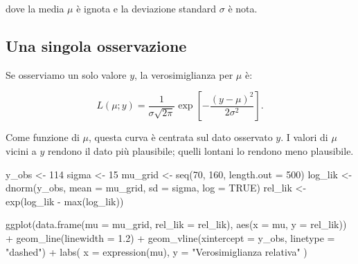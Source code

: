 \documentclass[
  italian,
  letterpaper,
  a4paper,
  11pt,
  open=any]{scrbook}
\newenvironment{Shaded}{\begin{snugshade}}{\end{snugshade}}
\newcommand{\AttributeTok}[1]{\textcolor[rgb]{0.40,0.45,0.13}{#1}}
\newcommand{\ConstantTok}[1]{\textcolor[rgb]{0.56,0.35,0.01}{#1}}
\newcommand{\DecValTok}[1]{\textcolor[rgb]{0.68,0.00,0.00}{#1}}
\newcommand{\FloatTok}[1]{\textcolor[rgb]{0.68,0.00,0.00}{#1}}
\newcommand{\FunctionTok}[1]{\textcolor[rgb]{0.28,0.35,0.67}{#1}}
\newcommand{\NormalTok}[1]{\textcolor[rgb]{0.00,0.23,0.31}{#1}}
\newcommand{\OtherTok}[1]{\textcolor[rgb]{0.00,0.23,0.31}{#1}}
\newcommand{\SpecialCharTok}[1]{\textcolor[rgb]{0.37,0.37,0.37}{#1}}
\newcommand{\StringTok}[1]{\textcolor[rgb]{0.13,0.47,0.30}{#1}}
\theoremstyle{plain}
\theoremstyle{definition}
\theoremstyle{definition}
\theoremstyle{remark}
\begin{document}
dove la media \(\mu\) è ignota e la deviazione standard \(\sigma\) è
nota.

\subsection{Una singola osservazione}\label{una-singola-osservazione}

Se osserviamo un solo valore \(y\), la verosimiglianza per \(\mu\) è:

\[
L(\mu; y)
= \frac{1}{\sigma\sqrt{2\pi}}
\exp\left[-\frac{(y-\mu)^2}{2\sigma^2}\right].
\]

Come funzione di \(\mu\), questa curva è centrata sul dato osservato
\(y\). I valori di \(\mu\) vicini a \(y\) rendono il dato più
plausibile; quelli lontani lo rendono meno plausibile.

\begin{Shaded}
\begin{Highlighting}[]
\NormalTok{y\_obs }\OtherTok{\textless{}{-}} \DecValTok{114}
\NormalTok{sigma }\OtherTok{\textless{}{-}} \DecValTok{15}
\NormalTok{mu\_grid }\OtherTok{\textless{}{-}} \FunctionTok{seq}\NormalTok{(}\DecValTok{70}\NormalTok{, }\DecValTok{160}\NormalTok{, }\AttributeTok{length.out =} \DecValTok{500}\NormalTok{)}
\NormalTok{log\_lik }\OtherTok{\textless{}{-}} \FunctionTok{dnorm}\NormalTok{(y\_obs, }\AttributeTok{mean =}\NormalTok{ mu\_grid, }\AttributeTok{sd =}\NormalTok{ sigma, }\AttributeTok{log =} \ConstantTok{TRUE}\NormalTok{)}
\NormalTok{rel\_lik }\OtherTok{\textless{}{-}} \FunctionTok{exp}\NormalTok{(log\_lik }\SpecialCharTok{{-}} \FunctionTok{max}\NormalTok{(log\_lik))}

\FunctionTok{ggplot}\NormalTok{(}\FunctionTok{data.frame}\NormalTok{(}\AttributeTok{mu =}\NormalTok{ mu\_grid, }\AttributeTok{rel\_lik =}\NormalTok{ rel\_lik),}
       \FunctionTok{aes}\NormalTok{(}\AttributeTok{x =}\NormalTok{ mu, }\AttributeTok{y =}\NormalTok{ rel\_lik)) }\SpecialCharTok{+}
  \FunctionTok{geom\_line}\NormalTok{(}\AttributeTok{linewidth =} \FloatTok{1.2}\NormalTok{) }\SpecialCharTok{+}
  \FunctionTok{geom\_vline}\NormalTok{(}\AttributeTok{xintercept =}\NormalTok{ y\_obs, }\AttributeTok{linetype =} \StringTok{"dashed"}\NormalTok{) }\SpecialCharTok{+}
  \FunctionTok{labs}\NormalTok{(}
    \AttributeTok{x =} \FunctionTok{expression}\NormalTok{(mu),}
    \AttributeTok{y =} \StringTok{"Verosimiglianza relativa"}
\NormalTok{  )}
\end{Highlighting}
\end{Shaded}
\end{document}

